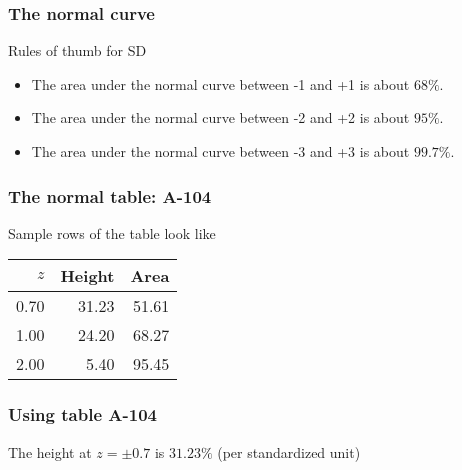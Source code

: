 \documentclass[handout]{beamer}
\begin{document}

   \begin{frame} \frametitle{The normal curve}

   \begin{block}
   {Rules of thumb for SD}
   \begin{itemize}
   \item The area under the normal curve between -1 and +1 is about $68\%$.
   \item The area under the normal curve between -2 and +2 is about $95\%$.
   \item The area under the normal curve between -3 and +3 is about $99.7\%$.
   \end{itemize}
   \end{block}
   \end{frame}


   \begin{frame} \frametitle{The normal table: A-104}

   \begin{block}
   {Sample rows of the table look like}
   \begin{tabular}{rrr}
   $z$ & Height & Area \\ \hline
   0.70 & 31.23 & 51.61 \\
   1.00 & 24.20 & 68.27 \\
   2.00 & 5.40 & 95.45 \\
   \end{tabular}
   \end{block}
   \end{frame}



   \begin{frame}
   \frametitle{Using table A-104}
   \begin{center}
   \end{center}
   The height at  $z= \pm 0.7$ is $31.23\%$ (per standardized unit)
   \end{frame}
\end{document}
